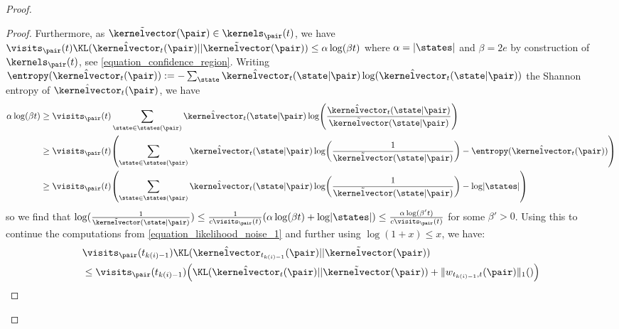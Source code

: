 \documentclass[preprint,cleveref,12pt]{colt2025}
\DeclarePairedDelimiter{\parens}{(}{)}	%
\DeclarePairedDelimiter{\abs}{\lvert}{\rvert}	%
\DeclarePairedDelimiter{\norm}{\lVert}{\rVert}	%
\def\kernel{\kernelvector}
\begin{document}
\begin{proof}
\begin{proof}
            Furthermore, as $\tilde{\kernel}(\pair) \in \kernels_\pair (t)$, we have $\visits_\pair (t) \KL(\hat{\kernel}_t(\pair)||\tilde{\kernel}(\pair)) \le \alpha \log(\beta t)$ where $\alpha = \abs{\states}$ and $\beta = 2e$ by construction of $\kernels_\pair(t)$, see \eqref{equation_confidence_region}.
            Writing $\entropy(\hat{\kernel}_t(\pair)) := - \sum_{\state} \hat{\kernel}_t(\state|\pair) \log(\hat{\kernel}_t(\state|\pair))$ the Shannon entropy of $\hat{\kernel}_t(\pair)$, we have
            \begin{align*}
                \alpha \log(\beta t)
                & \ge
                \visits_\pair (t) 
                \sum_{\state \in \states(\pair)}
                \hat{\kernel}_t(\state|\pair) 
                \log \parens*{
                    \frac{\hat{\kernel}_t(\state|\pair)}{\tilde{\kernel}(\state|\pair)}
                }
                \\
                & \ge
                \visits_\pair (t) 
                \parens*{
                    \sum_{\state \in \states(\pair)}
                    \hat{\kernel}_t(\state|\pair)
                    \log \parens*{\frac 1{\tilde{\kernel}(\state|\pair)}}
                    -
                    \entropy(\hat{\kernel}_t(\pair))
                }
                \\
                & \ge
                \visits_\pair (t) 
                \parens*{
                    \sum_{\state \in \states(\pair)}
                    \hat{\kernel}_t(\state|\pair)
                    \log \parens*{\frac 1{\tilde{\kernel}(\state|\pair)}}
                    -
                    \log \abs{\states}
                }
            \end{align*}
            so we find that $\log\parens{\frac 1{\tilde{\kernel}(\state|\pair)}} \le \frac 1{c \visits_\pair(t)} \parens{\alpha \log(\beta t) + \log \abs{\states}} \le \frac {\alpha \log(\beta' t)}{c\visits_\pair(t)}$ for some $\beta' > 0$.
            Using this to continue the computations from \eqref{equation_likelihood_noise_1} and further using $\log(1+x) \le x$, we have:
            \begin{align*}
                &
                \visits_\pair (t_{k(i)-1}) 
                \KL(\hat{\kernel}_{t_{k(i)-1}}(\pair)||\tilde{\kernel}(\pair))
                \\
                & \le 
                \visits_\pair (t_{k(i)-1}) \parens*{
                    \KL(\hat{\kernel}_{t}(\pair) || \tilde{\kernel}(\pair))
                    +
                    \norm{w_{t_{k(i)-1}, t}(\pair)}_1 \parens*{
}}
\end{align*}
\end{proof}
\end{proof}
\end{document}

